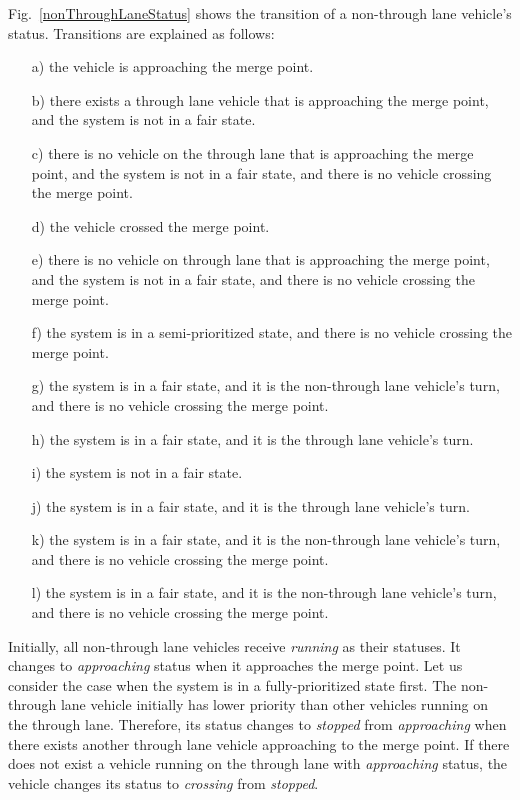 \documentclass[10pt, conference, compsocconf]{IEEEtran}
\begin{document}
Fig.~\ref{nonThroughLaneStatus} shows the transition of a non-through lane vehicle's status.
Transitions are explained as follows:
\begin{itemize}
    \item[a)] the vehicle is approaching the merge point. %
    \item[b)] there exists a through lane vehicle that is approaching the merge point, and the system is not in a fair state. %
    \item[c)] there is no vehicle on the through lane that is approaching the merge point, and the system is not in a fair state, and there is no vehicle crossing the merge point. %
    \item[d)] the vehicle crossed the merge point. %
    \item[e)] there is no vehicle on through lane that is approaching the merge point, and the system is not in a fair state, and there is no vehicle crossing the merge point. %
    \item[f)] the system is in a semi-prioritized state, and there is no vehicle crossing the merge point. %
    \item[g)] the system is in a fair state, and it is the non-through lane vehicle's turn, and there is no vehicle crossing the merge point. %
    \item[h)] the system is in a fair state, and it is the through lane vehicle's turn. %
    \item[i)] the system is not in a fair state. %
    \item[j)] the system is in a fair state, and it is the through lane vehicle's turn. %
    \item[k)] the system is in a fair state, and it is the non-through lane vehicle's turn, and there is no vehicle crossing the merge point. %
    \item[l)] the system is in a fair state, and it is the non-through lane vehicle's turn, and there is no vehicle crossing the merge point. %
\end{itemize}

Initially, all non-through lane vehicles receive \textit{running} as their statuses.
It changes to \textit{approaching} status when it approaches the merge point.
Let us consider the case when the system is in a fully-prioritized state first.
The non-through lane vehicle initially has lower priority than other vehicles running on the through lane.
Therefore, its status changes to \textit{stopped} from \textit{approaching} when there exists another through lane vehicle approaching to the merge point.
If there does not exist a vehicle running on the through lane with \textit{approaching} status, the vehicle changes its status to \textit{crossing} from \textit{stopped}.
\end{document}
